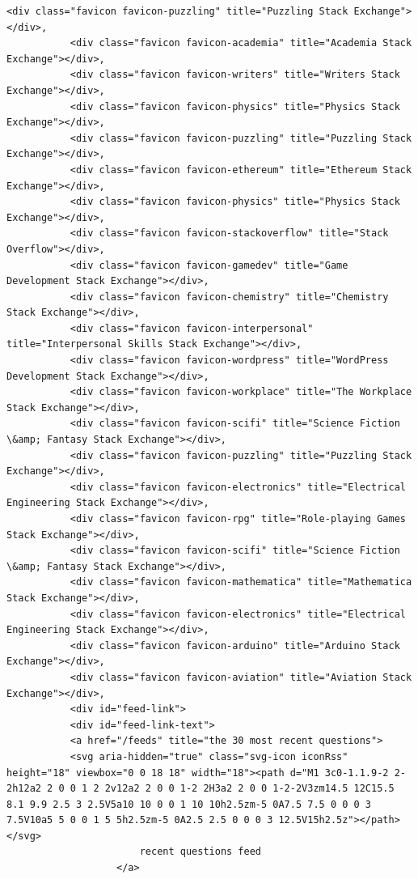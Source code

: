 \documentclass[11pt]{article}
\begin{document}
\begin{Verbatim}[commandchars=\\\{\}]
           <div class="favicon favicon-puzzling" title="Puzzling Stack Exchange"></div>,
           <div class="favicon favicon-academia" title="Academia Stack Exchange"></div>,
           <div class="favicon favicon-writers" title="Writers Stack Exchange"></div>,
           <div class="favicon favicon-physics" title="Physics Stack Exchange"></div>,
           <div class="favicon favicon-puzzling" title="Puzzling Stack Exchange"></div>,
           <div class="favicon favicon-ethereum" title="Ethereum Stack Exchange"></div>,
           <div class="favicon favicon-physics" title="Physics Stack Exchange"></div>,
           <div class="favicon favicon-stackoverflow" title="Stack Overflow"></div>,
           <div class="favicon favicon-gamedev" title="Game Development Stack Exchange"></div>,
           <div class="favicon favicon-chemistry" title="Chemistry Stack Exchange"></div>,
           <div class="favicon favicon-interpersonal" title="Interpersonal Skills Stack Exchange"></div>,
           <div class="favicon favicon-wordpress" title="WordPress Development Stack Exchange"></div>,
           <div class="favicon favicon-workplace" title="The Workplace Stack Exchange"></div>,
           <div class="favicon favicon-scifi" title="Science Fiction \&amp; Fantasy Stack Exchange"></div>,
           <div class="favicon favicon-puzzling" title="Puzzling Stack Exchange"></div>,
           <div class="favicon favicon-electronics" title="Electrical Engineering Stack Exchange"></div>,
           <div class="favicon favicon-rpg" title="Role-playing Games Stack Exchange"></div>,
           <div class="favicon favicon-scifi" title="Science Fiction \&amp; Fantasy Stack Exchange"></div>,
           <div class="favicon favicon-mathematica" title="Mathematica Stack Exchange"></div>,
           <div class="favicon favicon-electronics" title="Electrical Engineering Stack Exchange"></div>,
           <div class="favicon favicon-arduino" title="Arduino Stack Exchange"></div>,
           <div class="favicon favicon-aviation" title="Aviation Stack Exchange"></div>,
           <div id="feed-link">
           <div id="feed-link-text">
           <a href="/feeds" title="the 30 most recent questions">
           <svg aria-hidden="true" class="svg-icon iconRss" height="18" viewbox="0 0 18 18" width="18"><path d="M1 3c0-1.1.9-2 2-2h12a2 2 0 0 1 2 2v12a2 2 0 0 1-2 2H3a2 2 0 0 1-2-2V3zm14.5 12C15.5 8.1 9.9 2.5 3 2.5V5a10 10 0 0 1 10 10h2.5zm-5 0A7.5 7.5 0 0 0 3 7.5V10a5 5 0 0 1 5 5h2.5zm-5 0A2.5 2.5 0 0 0 3 12.5V15h2.5z"></path></svg>
                       recent questions feed
                   </a>

\end{Verbatim}
\end{document}
